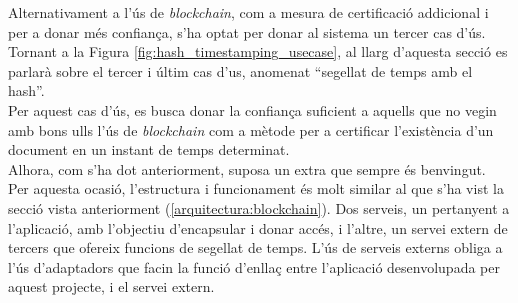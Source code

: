 Alternativament a l'ús de \textit{blockchain}, com a mesura de certificació addicional i per a donar més confiança, s'ha optat per donar al sistema un tercer cas d'ús.\\
\newline Tornant a la Figura \ref{fig:hash_timestamping_usecase}, al llarg d'aquesta secció es parlarà sobre el tercer i últim cas d'us, anomenat ``segellat de temps amb el hash''.\\
\newline Per aquest cas d'ús, es busca donar la confiança suficient a aquells que no vegin amb bons ulls l'ús de \textit{blockchain} com a mètode per a certificar l'existència d'un document en un instant de temps determinat.\\
Alhora, com s'ha dot anteriorment, suposa un extra que sempre és benvingut.\\
\newline Per aquesta ocasió, l'estructura i funcionament és molt similar al que s'ha vist la secció vista anteriorment (\ref{arquitectura:blockchain}). Dos serveis, un pertanyent a l'aplicació, amb l'objectiu d'encapsular i donar accés, i l'altre, un servei extern de tercers que ofereix funcions de segellat de temps.
\newline L'ús de serveis externs obliga a l'ús d'adaptadors que facin la funció d'enllaç entre l'aplicació desenvolupada per aquest projecte, i el servei extern.

